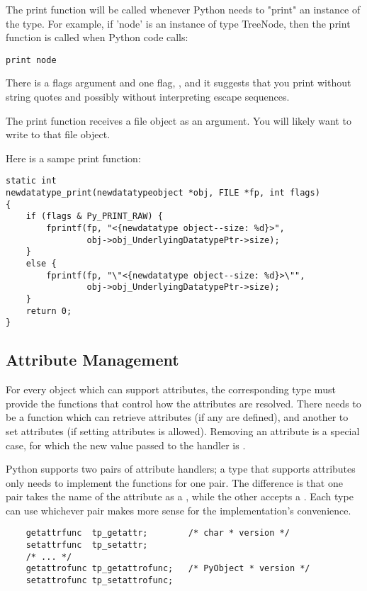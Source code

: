 The print function will be called whenever Python needs to "print" an
instance of the type.  For example, if 'node' is an instance of type
TreeNode, then the print function is called when Python code calls:

\begin{verbatim}
print node
\end{verbatim}

There is a flags argument and one flag, , and
it suggests that you print without string quotes and possibly without
interpreting escape sequences.

The print function receives a file object as an argument. You will
likely want to write to that file object.

Here is a sampe print function:

\begin{verbatim}
static int
newdatatype_print(newdatatypeobject *obj, FILE *fp, int flags)
{
    if (flags & Py_PRINT_RAW) {
        fprintf(fp, "<{newdatatype object--size: %d}>",
                obj->obj_UnderlyingDatatypePtr->size);
    }
    else {
        fprintf(fp, "\"<{newdatatype object--size: %d}>\"",
                obj->obj_UnderlyingDatatypePtr->size);
    }
    return 0;
}
\end{verbatim}


\subsection{Attribute Management}

For every object which can support attributes, the corresponding type
must provide the functions that control how the attributes are
resolved.  There needs to be a function which can retrieve attributes
(if any are defined), and another to set attributes (if setting
attributes is allowed).  Removing an attribute is a special case, for
which the new value passed to the handler is \NULL.

Python supports two pairs of attribute handlers; a type that supports
attributes only needs to implement the functions for one pair.  The
difference is that one pair takes the name of the attribute as a
, while the other accepts a .  Each type
can use whichever pair makes more sense for the implementation's
convenience.

\begin{verbatim}
    getattrfunc  tp_getattr;        /* char * version */
    setattrfunc  tp_setattr;
    /* ... */
    getattrofunc tp_getattrofunc;   /* PyObject * version */
    setattrofunc tp_setattrofunc;
\end{verbatim}

